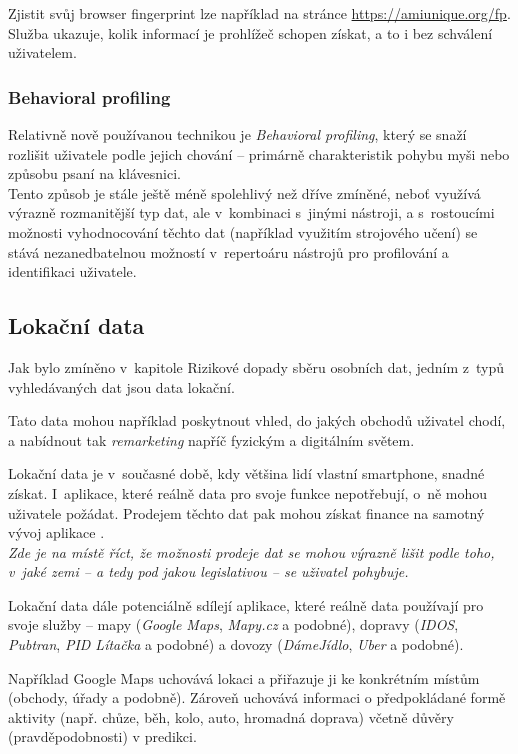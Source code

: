 Zjistit svůj browser fingerprint lze například na stránce \url{https://amiunique.org/fp}. Služba ukazuje, kolik informací je prohlížeč schopen získat, a to i bez schválení uživatelem. 

\subsubsection{Behavioral profiling}
Relativně nově používanou technikou je \textit{Behavioral profiling}, který se snaží rozlišit uživatele podle jejich chování -- primárně charakteristik pohybu myši nebo způsobu psaní na klávesnici\citep{behavioral-profiling}\citep{mouse-behavioral-biometrics}\citep{digital-behavior-fingerprint}.\\
Tento způsob je stále ještě méně spolehlivý než dříve zmíněné, neboť využívá výrazně rozmanitější typ dat, ale v~kombinaci s~jinými nástroji, a s~rostoucími možnosti vyhodnocování těchto dat (například využitím strojového učení) se stává nezanedbatelnou možností v~repertoáru nástrojů pro profilování a identifikaci uživatele.

\subsection{Lokační data}
Jak bylo zmíněno v~kapitole Rizikové dopady sběru osobních dat, jedním z~typů vyhledávaných dat jsou data lokační.

Tato data mohou například poskytnout vhled, do jakých obchodů uživatel chodí, a nabídnout tak \textit{remarketing} napříč fyzickým a digitálním světem.

Lokační data je v~současné době, kdy většina lidí vlastní smartphone, snadné získat. I~aplikace, které reálně data pro svoje funkce nepotřebují, o~ně mohou uživatele požádat. Prodejem těchto dat pak mohou získat finance na samotný vývoj aplikace .\\
\textit{Zde je na místě říct, že možnosti prodeje dat se mohou výrazně lišit podle toho, v~jaké zemi -- a tedy pod jakou legislativou -- se uživatel pohybuje.}

Lokační data dále potenciálně sdílejí aplikace, které reálně data používají pro svoje služby -- mapy (\textit{Google Maps}, \textit{Mapy.cz} a podobné), dopravy (\textit{IDOS}, \textit{Pubtran}, \textit{PID Lítačka} a podobné) a dovozy (\textit{DámeJídlo}, \textit{Uber}  a podobné).

Například Google Maps uchovává lokaci a přiřazuje ji ke konkrétním místům (obchody, úřady a podobně). Zároveň uchovává informaci o předpokládané formě aktivity (např. chůze, běh, kolo, auto, hromadná doprava) včetně důvěry (pravděpodobnosti) v predikci.

